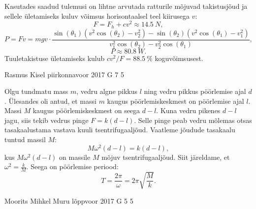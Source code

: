 \documentclass[11pt]{article}
\begin{document}
{{Kasutades saadud tulemusi on lihtne arvutada ratturile mõjuvad
takistusjõud ja sellele ületamiseks kuluv võimsus horisontaalsel teel
kiirusega $v$:
\[
F=F_{h}+cv^{2}\approx\SI{14.5}{N},
\]
\[
P=Fv=mgv\cdot\frac{\sin(\theta_{1})\left(v^{2}\cos(\theta_2)-v_{2}^{2}\right)-\sin(\theta_{2})\left(v^{2}\cos(\theta_1)-v_{1}^{2}\right)}{v_{1}^{2}\cos(\theta_2)-v_{2}^{2}\cos(\theta_1)},
\]
\[
P\approx\SI{80.8}{W}.
\]
Tuuletakistuse ületamiseks kulub $cv^{2}/F=\SI{88.5}{\percent}$
koguvõimsusest.
\fi
}

{Rasmus Kisel} %
{piirkonnavoor} %
{2017} %
{G 7} %
{5} %
{

\ifSolution
Olgu tundmatu mass $m$, vedru algne pikkus $l$ ning vedru pikkus pöörlemise ajal $d$. Ülesandes oli antud, et massi $m$ kaugus pöörlemiskeskmest on pöörlemise ajal $l$. Massi $M$ kaugus pöörlemiskeskmest on seega $d-l$.
Kuna vedru pikenes $d-l$ jagu, siis tekib vedrus pinge $F=k(d-l)$. Selle pinge peab vedru mõlemas otsas tasakaalustama vastava kuuli tsentrifugaaljõud. Vaatleme jõudude tasakaalu tuntud massil $M$:
\begin{equation*}
M\omega^2(d-l)=k(d-l),
\end{equation*}
kus $M\omega^2(d-l)$ on massile $M$ mõjuv tsentrifugaaljõud.
Siit järeldame, et $\omega^2=\frac{k}{M}$. Seega on pöörlemise periood:
\begin{equation*}
T=\frac{2\pi}{\omega}=2\pi \sqrt{\frac{M}{k}}.
\end{equation*}
\fi
}

{Moorits Mihkel Muru} %
{lõppvoor} %
{2017} %
{G 5} %
{5} %
{

}}
\end{document}
